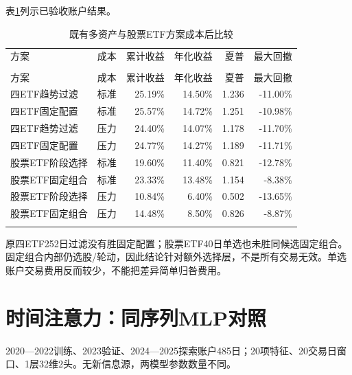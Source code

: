 \documentclass[12pt]{article}
\newcommand{\toprule}{\noalign{\hrule height .8pt}}
\newcommand{\midrule}{\noalign{\hrule height .4pt}}
\newcommand{\bottomrule}{\noalign{\hrule height .8pt}}
\begin{document}
表\ref{tab:v3supp1}列示已验收账户结果。
{\footnotesize
\begin{longtable}{@{}lrrrrr@{}}
\caption{既有多资产与股票ETF方案成本后比较}\label{tab:v3supp1}\\
\toprule
方案 & 成本 & 累计收益 & 年化收益 & 夏普 & 最大回撤 \\
\midrule\endfirsthead
\multicolumn{6}{c}{表\thetable（续）}\\\toprule
方案 & 成本 & 累计收益 & 年化收益 & 夏普 & 最大回撤 \\\midrule\endhead
四ETF趋势过滤 & 标准 & 25.19\% & 14.50\% & 1.236 & -11.00\% \\
四ETF固定配置 & 标准 & 25.57\% & 14.72\% & 1.251 & -10.98\% \\
四ETF趋势过滤 & 压力 & 24.40\% & 14.07\% & 1.178 & -11.70\% \\
四ETF固定配置 & 压力 & 24.77\% & 14.27\% & 1.189 & -11.71\% \\
股票ETF阶段选择 & 标准 & 19.60\% & 11.40\% & 0.821 & -12.78\% \\
股票ETF固定组合 & 标准 & 23.33\% & 13.48\% & 1.154 & -8.38\% \\
股票ETF阶段选择 & 压力 & 10.84\% & 6.40\% & 0.502 & -13.65\% \\
股票ETF固定组合 & 压力 & 14.48\% & 8.50\% & 0.826 & -8.87\% \\
\bottomrule\end{longtable}}
原四ETF252日过滤没有胜固定配置；股票ETF40日单选也未胜同候选固定组合。固定组合内部仍选股/轮动，因此结论针对额外选择层，不是所有交易无效。单选账户交易费用反而较少，不能把差异简单归咎费用。

\section{时间注意力：同序列MLP对照}
2020—2022训练、2023验证、2024—2025探索账户485日；20项特征、20交易日窗口、1层32维2头。无新信息源，两模型参数数量不同。
\end{document}
